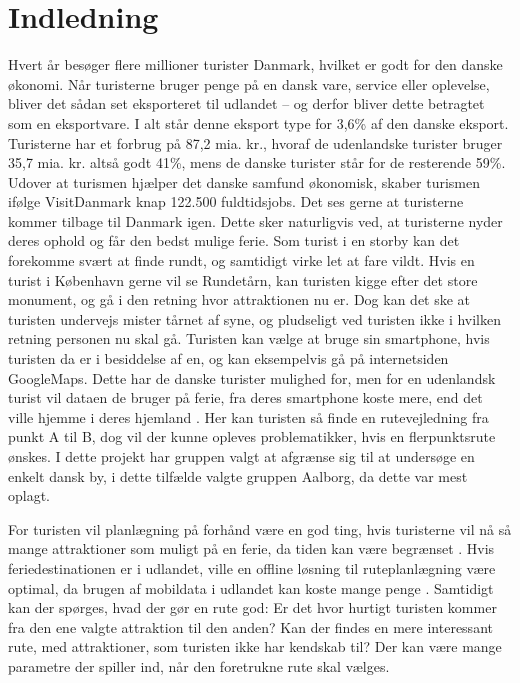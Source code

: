 \chapter{Indledning}

Hvert år besøger flere millioner turister Danmark, hvilket er godt for den danske økonomi. Når turisterne bruger penge på en dansk vare, service eller oplevelse, bliver det sådan set eksporteret til udlandet – og derfor bliver dette betragtet som en eksportvare. I alt står denne eksport type for 3,6\% af den danske eksport. Turisterne har et forbrug på 87,2 mia. kr., hvoraf de udenlandske turister bruger 35,7 mia. kr. altså godt 41\%, mens de danske turister står for de resterende 59\%. Udover at turismen hjælper det danske samfund økonomisk, skaber turismen ifølge VisitDanmark knap 122.500 fuldtidsjobs. \citep{faktaogtalVD}  \newline
Det ses gerne at turisterne kommer tilbage til Danmark igen. Dette sker naturligvis ved, at turisterne nyder deres ophold og får den bedst mulige ferie. Som turist i en storby kan det forekomme svært at finde rundt, og samtidigt virke let at fare vildt. Hvis en turist i København gerne vil se Rundetårn, kan turisten kigge efter det store monument, og gå i den retning hvor attraktionen nu er. Dog kan det ske at turisten undervejs mister tårnet af syne, og pludseligt ved turisten ikke i hvilken retning personen nu skal gå. Turisten kan vælge at bruge sin smartphone, hvis turisten da er i besiddelse af en, og kan eksempelvis gå på internetsiden GoogleMaps. Dette har de danske turister mulighed for, men for en udenlandsk turist vil dataen de bruger på ferie, fra deres smartphone koste mere, end det ville hjemme i deres hjemland \citep{VF}.  Her kan turisten så finde en rutevejledning fra punkt A til B, dog vil der kunne opleves problematikker, hvis en flerpunktsrute ønskes. I dette projekt har gruppen valgt at afgrænse sig til at undersøge en enkelt dansk by, i dette tilfælde valgte gruppen Aalborg, da dette var mest oplagt.

For turisten vil planlægning på forhånd være en god ting, hvis turisterne vil nå så mange attraktioner som muligt på en ferie, da tiden kan være begrænset \citep{YouthCentral}. Hvis feriedestinationen er i udlandet, ville en offline løsning til ruteplanlægning være optimal, da brugen af mobildata i udlandet kan koste mange penge \citep {TDC}.\newline
Samtidigt kan der spørges, hvad der gør en rute god: Er det hvor hurtigt turisten kommer fra den ene valgte attraktion til den anden? Kan der findes en mere interessant rute, med attraktioner, som turisten ikke har kendskab til? Der kan være mange parametre der spiller ind, når den foretrukne rute skal vælges.

